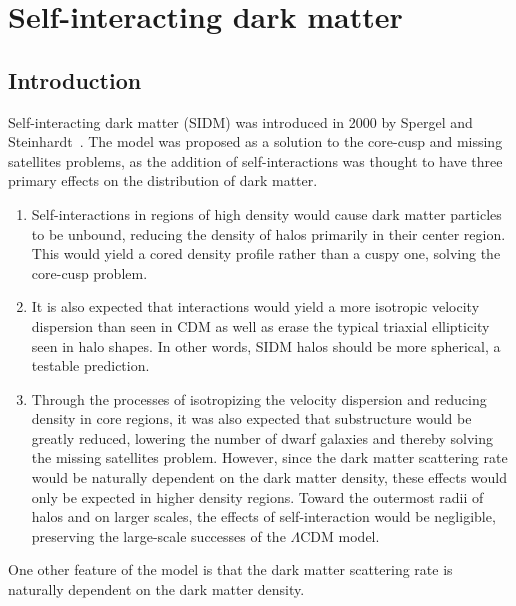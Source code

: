 \hypertarget{self-interacting-dark-matter}{%
\chapter{Self-interacting dark
matter}\label{self-interacting-dark-matter}}

\hypertarget{introduction}{%
\section{Introduction}\label{introduction}}

Self-interacting dark matter (SIDM) was introduced in 2000 by Spergel
and Steinhardt~\cite{spergel_observational_2000}. The model was proposed as
a solution to the core-cusp and missing satellites problems, as the
addition of self-interactions was thought to have three primary effects
on the distribution of dark matter. 

\begin{enumerate}
    \item Self-interactions in regions of high density would cause dark matter
    particles to be unbound, reducing the density of halos primarily in their
    center region. This would yield a cored density profile rather than a
    cuspy one, solving the core-cusp problem.

    \item It is also expected that interactions would yield a more isotropic
    velocity dispersion than seen in CDM as well as erase the typical triaxial
    ellipticity seen in halo shapes. In other words, SIDM halos should be more
    spherical, a testable prediction.

    \item Through the processes of isotropizing the velocity dispersion and
    reducing density in core regions, it was also expected that substructure
    would be greatly reduced, lowering the number of dwarf galaxies and
    thereby solving the missing satellites problem. However, since the dark
    matter scattering rate would be naturally dependent on the dark matter
    density, these effects would only be expected in higher density regions.
    Toward the outermost radii of halos and on larger scales, the effects of
    self-interaction would be negligible, preserving the large-scale successes
    of the \(\Lambda\)CDM model.
\end{enumerate}

One other feature of the model is that the dark matter scattering rate is
naturally dependent on the dark matter density. 


